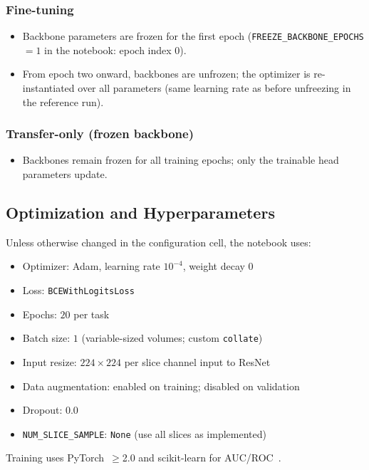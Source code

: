 \documentclass[10pt,twocolumn]{article}
\begin{document}
\subsubsection{Fine-tuning}
\begin{itemize}[noitemsep,topsep=0pt]
    \item Backbone parameters are frozen for the first epoch (\texttt{FREEZE\_BACKBONE\_EPOCHS}${}=1$ in the notebook: epoch index $0$).
    \item From epoch two onward, backbones are unfrozen; the optimizer is re-instantiated over all parameters (same learning rate as before unfreezing in the reference run).
\end{itemize}

\subsubsection{Transfer-only (frozen backbone)}
\begin{itemize}[noitemsep,topsep=0pt]
    \item Backbones remain frozen for all training epochs; only the trainable head parameters update.
\end{itemize}

\subsection{Optimization and Hyperparameters}

Unless otherwise changed in the configuration cell, the notebook uses:
\begin{itemize}[noitemsep,topsep=0pt]
    \item Optimizer: Adam, learning rate $10^{-4}$, weight decay $0$
    \item Loss: \texttt{BCEWithLogitsLoss}
    \item Epochs: $20$ per task
    \item Batch size: $1$ (variable-sized volumes; custom \texttt{collate})
    \item Input resize: $224\times 224$ per slice channel input to ResNet
    \item Data augmentation: enabled on training; disabled on validation
    \item Dropout: $0.0$
    \item \texttt{NUM\_SLICE\_SAMPLE}: \texttt{None} (use all slices as implemented)
\end{itemize}

Training uses PyTorch~$\geq$2.0 and scikit-learn for AUC/ROC~\cite{requirements}.
\end{document}
